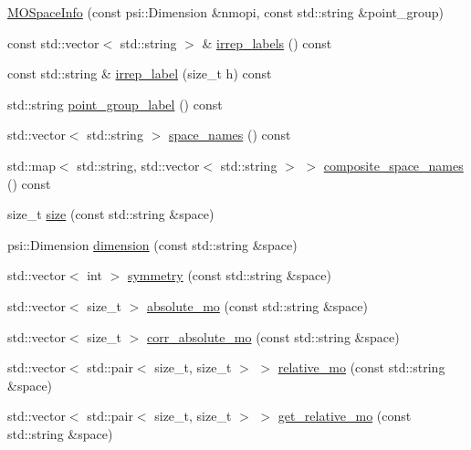\begin{DoxyCompactItemize}
\item 
\mbox{\hyperlink{classforte_1_1_m_o_space_info_ae35cde14c423e8330c03c32863a2a708}{M\+O\+Space\+Info}} (const psi\+::\+Dimension \&nmopi, const std\+::string \&point\+\_\+group)
\item 
const std\+::vector$<$ std\+::string $>$ \& \mbox{\hyperlink{classforte_1_1_m_o_space_info_ade21c9d061b62614d2888f129bb8c8e0}{irrep\+\_\+labels}} () const
\item 
const std\+::string \& \mbox{\hyperlink{classforte_1_1_m_o_space_info_ab5acae63812eb49f7551c892821fb2ab}{irrep\+\_\+label}} (size\+\_\+t h) const
\item 
std\+::string \mbox{\hyperlink{classforte_1_1_m_o_space_info_a066b51d0bed79d6a433eac5194f7f66d}{point\+\_\+group\+\_\+label}} () const
\item 
std\+::vector$<$ std\+::string $>$ \mbox{\hyperlink{classforte_1_1_m_o_space_info_a4b76861f449b11c9847efcc28c2e0c1b}{space\+\_\+names}} () const
\item 
std\+::map$<$ std\+::string, std\+::vector$<$ std\+::string $>$ $>$ \mbox{\hyperlink{classforte_1_1_m_o_space_info_ae95e8a5714111df520ec4b89058f9956}{composite\+\_\+space\+\_\+names}} () const
\item 
size\+\_\+t \mbox{\hyperlink{classforte_1_1_m_o_space_info_a7146ec7630439cf73c49ceb238fc12a6}{size}} (const std\+::string \&space)
\item 
psi\+::\+Dimension \mbox{\hyperlink{classforte_1_1_m_o_space_info_a99541e74c30572a6e2cf87e2a6fb7ebd}{dimension}} (const std\+::string \&space)
\item 
std\+::vector$<$ int $>$ \mbox{\hyperlink{classforte_1_1_m_o_space_info_a8756f0a82f1d3dcd3db3b11fb52a80fc}{symmetry}} (const std\+::string \&space)
\item 
std\+::vector$<$ size\+\_\+t $>$ \mbox{\hyperlink{classforte_1_1_m_o_space_info_a4328ee82ef7ca2237b5f1b1055f18f41}{absolute\+\_\+mo}} (const std\+::string \&space)
\item 
std\+::vector$<$ size\+\_\+t $>$ \mbox{\hyperlink{classforte_1_1_m_o_space_info_ad7d1a1daec658c71eff4c20688fc4bd1}{corr\+\_\+absolute\+\_\+mo}} (const std\+::string \&space)
\item 
std\+::vector$<$ std\+::pair$<$ size\+\_\+t, size\+\_\+t $>$ $>$ \mbox{\hyperlink{classforte_1_1_m_o_space_info_a39e62f3f0cdad4fa40f98a86b0eaf5e2}{relative\+\_\+mo}} (const std\+::string \&space)
\item 
std\+::vector$<$ std\+::pair$<$ size\+\_\+t, size\+\_\+t $>$ $>$ \mbox{\hyperlink{classforte_1_1_m_o_space_info_a46b6bf53859758541d56259c818557d5}{get\+\_\+relative\+\_\+mo}} (const std\+::string \&space)

\end{DoxyCompactItemize}
